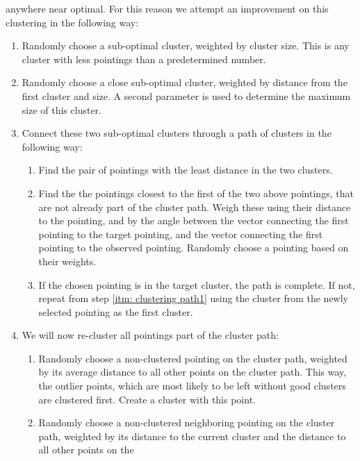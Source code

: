 \documentclass{report}
\begin{document}
\begin{enumerate}
\begin{enumerate}
        anywhere near optimal. For this reason we attempt an improvement on this clustering in the following way:
        \begin{enumerate}
            \item Randomly choose a sub-optimal cluster, weighted by cluster size. This is any cluster with less
            pointings than a predetermined number.
            \item Randomly choose a close sub-optimal cluster, weighted by distance from the first cluster and size. A
            second parameter is used to determine the maximum size of this cluster.
            \item Connect these two sub-optimal clusters through a path of clusters in the following way:
            \begin{enumerate}
                \item \label{itm: clustering path1}Find the pair of pointings with the least distance in the two clusters.
                \item Find the the pointings closest to the first of the two above pointings, that are not already part
                of the cluster path. Weigh these using their distance to the pointing, and by the angle between the
                vector connecting the first pointing to the target pointing, and the vector connecting the first
                pointing to the observed pointing. Randomly choose a pointing based on their weights.
                \item If the chosen pointing is in the target cluster, the path is complete. If not, repeat from step
                \ref{itm: clustering path1} using the cluster from the newly selected pointing as the first cluster.
            \end{enumerate}
            \item We will now re-cluster all pointings part of the cluster path:
            \begin{enumerate}
                \item \label{itm: reclustering1} Randomly choose a non-clustered pointing on the cluster path, weighted
                by its average distance to all other points on the cluster path. This way, the outlier points, which
                are most likely to be left without good clusters are clustered first. Create a cluster with this point.
                \item \label{itm: reclustering2} Randomly choose a non-clustered neighboring pointing on the cluster
                path, weighted by its distance to the current cluster and the distance to all other points on the

\end{enumerate}
\end{enumerate}
\end{enumerate}
\end{enumerate}
\end{document}
